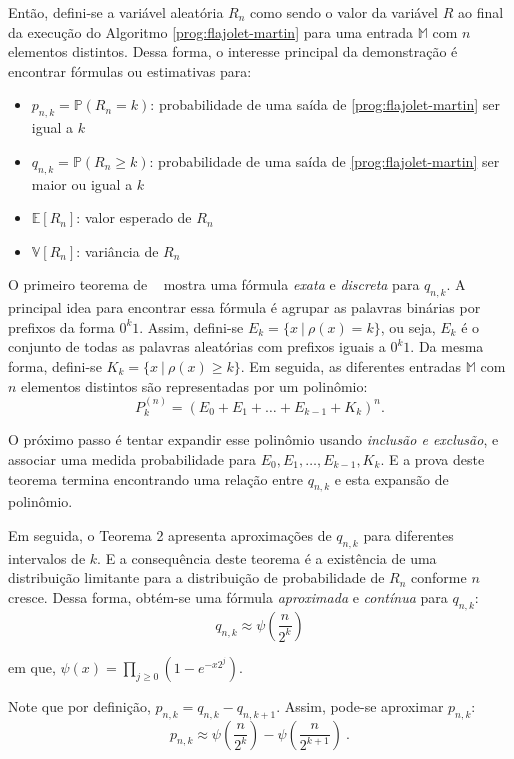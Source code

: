 Então, defini-se a variável aleatória $R_n$ como sendo o valor da variável $R$ ao final da execução do Algoritmo 
\ref{prog:flajolet-martin} para uma entrada $\mathbb{M}$ com $n$ elementos distintos. Dessa forma, o interesse principal 
da demonstração é encontrar fórmulas ou estimativas para:
\begin{itemize}
  \item $p_{n,k} = \mathbb{P}(R_n = k)$: probabilidade de uma saída de \ref{prog:flajolet-martin} ser igual a $k$
  \item $q_{n,k} = \mathbb{P}(R_n \geq k)$: probabilidade de uma saída de \ref{prog:flajolet-martin} 
  ser maior ou igual a $k$
  \item $\mathbb{E}[R_n]$: valor esperado de $R_n$
  \item $\mathbb{V}[R_n]$: variância de $R_n$
\end{itemize}

O primeiro teorema de ~\citep{flajolet:martin:85} mostra uma fórmula \textit{exata} e \textit{discreta} para $q_{n,k}$. 
A principal idea para encontrar essa fórmula é agrupar as palavras binárias por prefixos da forma $0^k1$. Assim, 
defini-se $E_k = \{ x  \ | \ \rho(x) = k \}$, ou seja, $E_k$ é o conjunto de todas as palavras aleatórias com prefixos
iguais a $0^k1$. Da mesma forma, defini-se $K_k = \{ x \ | \ \rho(x) \geq k \}$. Em seguida, as diferentes entradas 
$\mathbb{M}$ com $n$ elementos distintos são representadas por um polinômio:
\[ P_k^{(n)} = (E_0 + E_1 + \dots + E_{k-1} + K_k)^n .\]

O próximo passo é tentar expandir esse polinômio usando \textit{inclusão e exclusão}, e associar uma medida 
probabilidade para $E_0, E_1, \dots, E_{k-1}, K_k$. E a prova deste teorema termina encontrando uma relação entre 
$q_{n,k}$ e esta expansão de polinômio.

Em seguida, o Teorema 2 apresenta aproximações de $q_{n,k}$ para diferentes intervalos de $k$. E a consequência deste 
teorema é a existência de uma distribuição limitante para a distribuição de probabilidade de $R_n$ conforme $n$ cresce. 
Dessa forma, obtém-se uma fórmula \textit{aproximada} e \textit{contínua} para $q_{n,k}$:
\[ q_{n,k} \approx \psi(\frac{n}{2^k}) \]

em que, $\psi(x) = \prod_{j \geq 0} (1 - e^{-x2^j})$.

Note que por definição, $p_{n,k} = q_{n,k} - q_{n,k+1}$. Assim, pode-se aproximar $p_{n,k}$:
\[ p_{n,k} \approx \psi(\frac{n}{2^k}) - \psi(\frac{n}{2^{k+1}}) \ . \]

